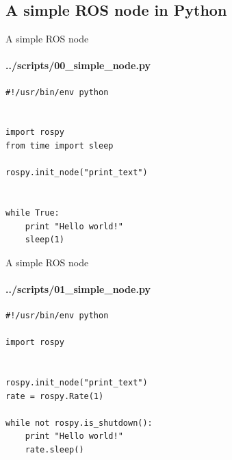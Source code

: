\documentclass{beamer}
\begin{document}
\subsection{A simple ROS node in Python}

\begin{frame}[fragile]{A simple ROS node}
    \framesubtitle{   ../scripts/00\_simple\_node.py}
    \begin{lstlisting}
#!/usr/bin/env python


import rospy
from time import sleep

rospy.init_node("print_text")


while True:
    print "Hello world!"
    sleep(1)
    \end{lstlisting}
\end{frame}



\begin{frame}[fragile]{A simple ROS node}
    \framesubtitle{   ../scripts/01\_simple\_node.py}
\begin{lstlisting}
#!/usr/bin/env python

import rospy


rospy.init_node("print_text")  
rate = rospy.Rate(1)

while not rospy.is_shutdown():
    print "Hello world!"
    rate.sleep()
\end{lstlisting}
\end{frame}
\end{document}
